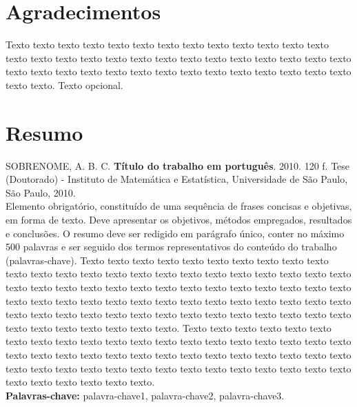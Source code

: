 \documentclass[11pt,twoside,a4paper]{book}
\begin{document}

\chapter*{Agradecimentos}
Texto texto texto texto texto texto texto texto texto texto texto texto texto
texto texto texto texto texto texto texto texto texto texto texto texto texto
texto texto texto texto texto texto texto texto texto texto texto texto texto
texto texto texto texto. Texto opcional.


\chapter*{Resumo}

\noindent SOBRENOME, A. B. C. \textbf{Título do trabalho em português}. 
2010. 120 f.
Tese (Doutorado) - Instituto de Matemática e Estatística,
Universidade de São Paulo, São Paulo, 2010.
\\

Elemento obrigatório, constituído de uma sequência de frases concisas e
objetivas, em forma de texto.  Deve apresentar os objetivos, métodos empregados,
resultados e conclusões.  O resumo deve ser redigido em parágrafo único, conter
no máximo 500 palavras e ser seguido dos termos representativos do conteúdo do
trabalho (palavras-chave). 
Texto texto texto texto texto texto texto texto texto texto texto texto texto
texto texto texto texto texto texto texto texto texto texto texto texto texto
texto texto texto texto texto texto texto texto texto texto texto texto texto
texto texto texto texto texto texto texto texto texto texto texto texto texto
texto texto texto texto texto texto texto texto texto texto texto texto texto
texto texto texto texto texto texto texto texto.
Texto texto texto texto texto texto texto texto texto texto texto texto texto
texto texto texto texto texto texto texto texto texto texto texto texto texto
texto texto texto texto texto texto texto texto texto texto texto texto texto
texto texto texto texto texto texto texto texto texto texto texto texto texto
texto texto.
\\

\noindent \textbf{Palavras-chave:} palavra-chave1, palavra-chave2, palavra-chave3.
\end{document}
